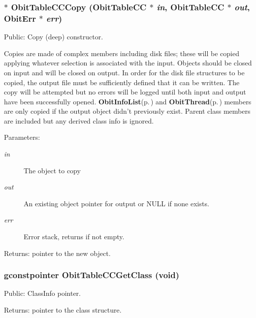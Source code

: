 \subsubsection{$\ast$ Obit\-Table\-CCCopy ({\bf Obit\-Table\-CC} $\ast$ {\em in}, {\bf Obit\-Table\-CC} $\ast$ {\em out}, {\bf Obit\-Err} $\ast$ {\em err})}\label{ObitTableCC_8c_a20}


Public: Copy (deep) constructor. 

Copies are made of complex members including disk files; these will be copied applying whatever selection is associated with the input. Objects should be closed on input and will be closed on output. In order for the disk file structures to be copied, the output file must be sufficiently defined that it can be written. The copy will be attempted but no errors will be logged until both input and output have been successfully opened. {\bf Obit\-Info\-List}{\rm (p.\,\pageref{structObitInfoList})} and {\bf Obit\-Thread}{\rm (p.\,\pageref{structObitThread})} members are only copied if the output object didn't previously exist. Parent class members are included but any derived class info is ignored. \begin{Desc}
\item[Parameters:]
\begin{description}
\item[{\em in}]The object to copy \item[{\em out}]An existing object pointer for output or NULL if none exists. \item[{\em err}]Error stack, returns if not empty. \end{description}
\end{Desc}
\begin{Desc}
\item[Returns:]pointer to the new object. \end{Desc}
\subsubsection{\setlength{\rightskip}{0pt plus 5cm}gconstpointer Obit\-Table\-CCGet\-Class (void)}\label{ObitTableCC_8c_a17}


Public: Class\-Info pointer. 

\begin{Desc}
\item[Returns:]pointer to the class structure. \end{Desc}

